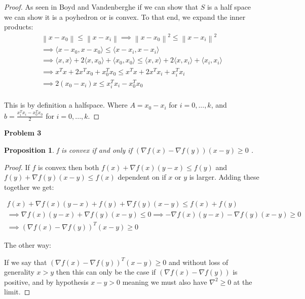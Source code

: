 \documentclass{article}
\newcommand{\norm}[1]{\left\lVert#1\right\rVert}
\newtheorem{prop}{Proposition}
\begin{document}
\begin{proof}

  As seen in Boyd and Vandenberghe if we can show that $S$ is a half space we can show it is a poyhedron or is convex. To that end, we expand the inner products:
  \begin{gather*}
    \norm{x-x_0} \leq \norm{x-x_i} \implies  \norm{x-x_0}^2 \leq \norm{x-x_i}^2\\
    \implies \langle x-x_0, x-x_0\rangle \leq \langle x-x_i, x-x_i\rangle\\
    \implies \langle x, x\rangle + 2\langle x, x_0 \rangle +  \langle x_0, x_0\rangle \leq \langle x, x\rangle + 2\langle x, x_i \rangle +  \langle x_i, x_i\rangle\\
    \implies x^Tx + 2x^Tx_0 + x_0^Tx_0 \leq x^Tx + 2x^Tx_i +  x_i^T x_i\\
    \implies 2(x_0-x_i)x \leq  x_i^T x_i -  x_0^Tx_0 \\
  \end{gather*}
  
  This is by definition a halfspace. Where $A = x_0 - x_i$ for $i = 0,...,k$, and $ b = \frac{ x_i^T x_i -  x_0^Tx_0}{2} $ for $i = 0,...,k$.
  

\end{proof}


\noindent\textbf{Problem 3}

\begin{prop}

  f is convex if and only if $(\nabla f(x) - \nabla f(y))(x-y) \geq 0$ .

\end{prop}

\begin{proof}

  If $f$ is convex then both $f(x) + \nabla f(x)(y-x) \leq f(y)$ and  $f(y) + \nabla f(y)(x-y) \leq f(x)$ dependent on if $x$ or $y$ is larger. Adding these together we get:

\begin{gather*}
  f(x) + \nabla f(x)(y-x) + f(y) + \nabla f(y)(x-y) \leq f(x) + f(y)\\
  \implies \nabla f(x)(y-x) + \nabla f(y)(x-y) \leq 0 \implies -\nabla f(x)(y-x) - \nabla f(y)(x-y) \geq 0\\
  \implies (\nabla f(x) - \nabla f(y))^T (x-y) \geq 0
\end{gather*}

\noindent The other way:

\noindent If we say that  $(\nabla f(x) - \nabla f(y))^T (x-y) \geq 0$ and without loss of generality $x>y$ then this can only be the case if $(\nabla f(x) - \nabla f(y))$ is positive, and by hypothesis $x-y>0$ meaning we must also have $\nabla ^2 \geq 0$ at the limit. 

  
\end{proof}
\end{document}
